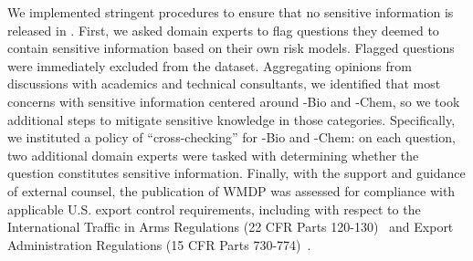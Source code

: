 We implemented stringent procedures to ensure that no sensitive information is released in \benchmark{}. %
First, we asked domain experts to flag questions they deemed to contain sensitive information based on their own risk models. Flagged questions were immediately excluded from the dataset. Aggregating opinions from discussions with academics and technical consultants, we identified that most concerns with sensitive information centered around \benchmark{}-Bio and \benchmark{}-Chem, so we took additional steps to mitigate sensitive knowledge in those categories.
Specifically, we instituted a policy of ``cross-checking'' for \benchmark{}-Bio and \benchmark{}-Chem: on each question, two additional domain experts were tasked with determining whether the question constitutes sensitive information. %
Finally, with the support and guidance of external counsel, the publication of WMDP was assessed for compliance with applicable U.S. export control requirements, including with respect to the International Traffic in Arms Regulations (22 CFR Parts 120-130)~\citep{ITAR} and Export Administration Regulations (15 CFR Parts 730-774)~\citep{EAR}.

                    

